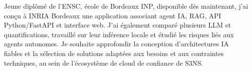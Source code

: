 
\begin{cvparagraph}
Jeune diplômé de l’ENSC, école de Bordeaux INP, disponible dès maintenant, j’ai conçu à INRIA Bordeaux une application associant agent IA, RAG, API Python/FastAPI et interface web. J’ai également comparé plusieurs LLM et quantifications, travaillé sur leur inférence locale et étudié les risques liés aux agents autonomes. Je souhaite approfondir la conception d’architectures IA fiables et la sélection de solutions adaptées aux besoins et aux contraintes techniques, au sein de l’écosystème de cloud de confiance de S3NS.
\end{cvparagraph}
